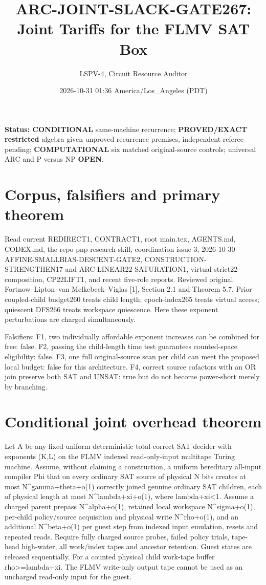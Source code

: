 \documentclass[11pt]{article}
\title{ARC-JOINT-SLACK-GATE267: Joint Tariffs for the FLMV SAT Box}
\author{LSPV-4, Circuit Resource Auditor}
\date{2026-10-31 01:36 America/Los\_Angeles (PDT)}
\begin{document}
\maketitle
\noindent\textbf{Status: CONDITIONAL} same-machine recurrence; \textbf{PROVED/EXACT restricted} algebra given unproved recurrence premises, independent referee pending; \textbf{COMPUTATIONAL} six matched original-source controls; universal ARC and P versus NP \textbf{OPEN}.

\section{Corpus, falsifiers and primary theorem}
Read current REDIRECT1, CONTRACT1, root main.tex, AGENTS.md, CODEX.md, the repo pnp-research skill, coordination issue 3, 2026-10-30 AFFINE-SMALLBIAS-DESCENT-GATE2, CONSTRUCTION-STRENGTHEN17 and ARC-LINEAR22-SATURATION1, virtual strict22 composition, CP22LIFT1, and recent five-role reports. Reviewed original Fortnow--Lipton--van Melkebeek--Viglas [1], Section 2.1 and Theorem 5.7. Prior coupled-child budget260 treats child length; epoch-index265 treats virtual access; quiescent DFS266 treats workspace quiescence. Here these exponent perturbations are charged simultaneously.

Falsifiers: F1, two individually affordable exponent increases can be combined for free: false. F2, passing the child-length time test guarantees counted-space eligibility: false. F3, one full original-source scan per child can meet the proposed local budget: false for this architecture. F4, correct source cofactors with an OR join preserve both SAT and UNSAT: true but do not become power-short merely by branching.

\section{Conditional joint overhead theorem}
Let A be any fixed uniform deterministic total correct SAT decider with exponents (K,L) on the FLMV indexed read-only-input multitape Turing machine. Assume, without claiming a construction, a uniform hereditary all-input compiler Phi that on every ordinary SAT source of physical N bits creates at most N^{gamma+theta+o(1)} correctly joined genuine ordinary SAT children, each of physical length at most N^{lambda+xi+o(1)}, where lambda+xi<1. Assume a charged parent prepass N^{alpha+o(1)}, retained local workspace N^{sigma+o(1)}, per-child policy/source acquisition and physical write N^{rho+o(1)}, and an additional N^{beta+o(1)} per guest step from indexed input emulation, resets and repeated reads. Require fully charged source probes, failed policy trials, tape-head high-water, all work/index tapes and ancestor retention. Guest states are released sequentially. For a counted physical child work-tape buffer rho>=lambda+xi. The FLMV write-only output tape cannot be used as an uncharged read-only input for the guest.
\end{document}
